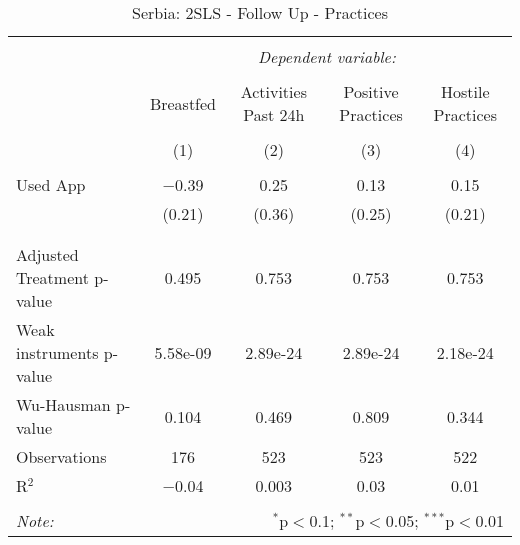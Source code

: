 
\begin{table}[!htbp] \centering 
  \caption{Serbia: 2SLS - Follow Up - Practices} 
  \label{tbl:Serbia: 2SLS - Follow Up - Practices} 
\begin{tabular}{@{\extracolsep{5pt}}lcccc} 
\\[-1.8ex]\hline 
\hline \\[-1.8ex] 
 & \multicolumn{4}{c}{\textit{Dependent variable:}} \\ 
\cline{2-5} 
\\[-1.8ex] & Breastfed & Activities Past 24h & Positive Practices & Hostile Practices \\ 
\\[-1.8ex] & (1) & (2) & (3) & (4)\\ 
\hline \\[-1.8ex] 
 Used App & $-$0.39 & 0.25 & 0.13 & 0.15 \\ 
  & (0.21) & (0.36) & (0.25) & (0.21) \\ 
  & & & & \\ 
\hline \\[-1.8ex] 
Adjusted Treatment p-value & 0.495 & 0.753 & 0.753 & 0.753 \\ 
Weak instruments p-value & 5.58e-09 & 2.89e-24 & 2.89e-24 & 2.18e-24 \\ 
Wu-Hausman p-value & 0.104 & 0.469 & 0.809 & 0.344 \\ 
Observations & 176 & 523 & 523 & 522 \\ 
R$^{2}$ & $-$0.04 & 0.003 & 0.03 & 0.01 \\ 
\hline 
\hline \\[-1.8ex] 
\textit{Note:}  & \multicolumn{4}{r}{$^{*}$p$<$0.1; $^{**}$p$<$0.05; $^{***}$p$<$0.01} \\ 
\end{tabular} 
\end{table} 
